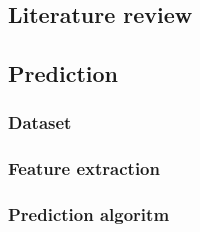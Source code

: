 


%

\subsection{Literature review}

\subsection{Prediction}

\subsubsection{Dataset}

\subsubsection{Feature extraction}

\subsubsection{Prediction algoritm}
